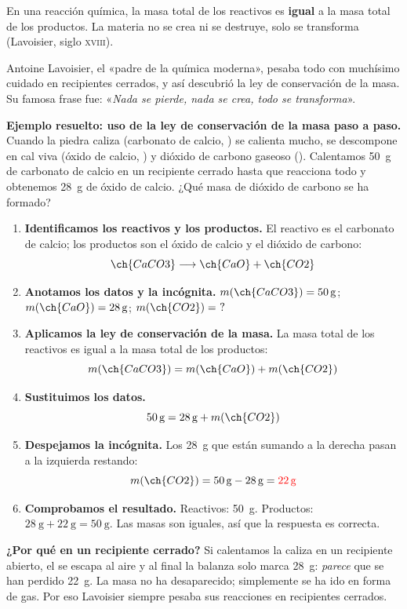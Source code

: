 \begin{definition}
    En una reacción química, la masa total de los reactivos es \textbf{igual} a la masa total de los productos. La materia no se crea ni se destruye, solo se transforma (Lavoisier, siglo \textsc{xviii}).
\end{definition}

\begin{didyouknow}
    Antoine Lavoisier, el «padre de la química moderna», pesaba todo con muchísimo cuidado en recipientes cerrados, y así descubrió la ley de conservación de la masa. Su famosa frase fue: «\emph{Nada se pierde, nada se crea, todo se transforma}».
\end{didyouknow}

\begin{example}
    \textbf{Ejemplo resuelto: uso de la ley de conservación de la masa paso a paso.} Cuando la piedra caliza (carbonato de calcio, ) se calienta mucho, se descompone en cal viva (óxido de calcio, ) y dióxido de carbono gaseoso (). Calentamos \qty{50}{\g} de carbonato de calcio en un recipiente cerrado hasta que reacciona todo y obtenemos \qty{28}{\g} de óxido de calcio. ¿Qué masa de dióxido de carbono se ha formado?
    \begin{enumerate}[label=\numberballmDarkTeal]
        \item \textbf{Identificamos los reactivos y los productos.} El reactivo es el carbonato de calcio; los productos son el óxido de calcio y el dióxido de carbono:
        \[
            \ch{CaCO3} \longrightarrow \ch{CaO} + \ch{CO2}
        \]
        \item \textbf{Anotamos los datos y la incógnita.} \(m(\ch{CaCO3}) = \qty{50}{\g}\); \quad \(m(\ch{CaO}) = \qty{28}{\g}\); \quad \(m(\ch{CO2}) = \ ?\)
        \item \textbf{Aplicamos la ley de conservación de la masa.} La masa total de los reactivos es igual a la masa total de los productos:
        \[
            m(\ch{CaCO3}) = m(\ch{CaO}) + m(\ch{CO2})
        \]
        \item \textbf{Sustituimos los datos.}
        \[
            \qty{50}{\g} = \qty{28}{\g} + m(\ch{CO2})
        \]
        \item \textbf{Despejamos la incógnita.} Los \qty{28}{\g} que están sumando a la derecha pasan a la izquierda restando:
        \[
            m(\ch{CO2}) = \qty{50}{\g} - \qty{28}{\g} = \textcolor{red}{\qty{22}{\g}}
        \]
        \item \textbf{Comprobamos el resultado.} Reactivos: \qty{50}{\g}. Productos: \(\qty{28}{\g} + \qty{22}{\g} = \qty{50}{\g}\). Las masas son iguales, así que la respuesta es correcta.
    \end{enumerate}
    \textbf{¿Por qué en un recipiente cerrado?} Si calentamos la caliza en un recipiente abierto, el  se escapa al aire y al final la balanza solo marca \qty{28}{\g}: \emph{parece} que se han perdido \qty{22}{\g}. La masa no ha desaparecido; simplemente se ha ido en forma de gas. Por eso Lavoisier siempre pesaba sus reacciones en recipientes cerrados.
\end{example}

